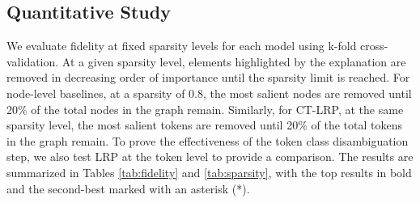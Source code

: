 \subsection{Quantitative Study}
We evaluate fidelity at fixed sparsity levels for each model using k-fold cross-validation. At a given sparsity level, elements highlighted by the explanation are removed in decreasing order of importance until the sparsity limit is reached. For node-level baselines, at a sparsity of 0.8, the most salient nodes are removed until 20\% of the total nodes in the graph remain. Similarly, for CT-LRP, at the same sparsity level, the most salient tokens are removed until 20\% of the total tokens in the graph remain. To prove the effectiveness of the token class disambiguation step, we also test LRP at the token level to provide a comparison. The results are summarized in Tables \ref{tab:fidelity} and \ref{tab:sparsity}, with the top results in bold and the second-best marked with an asterisk (*).





